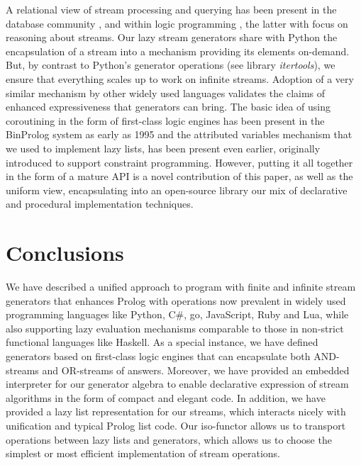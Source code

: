\documentclass{new_tlp}
\begin{document}
A relational view of stream processing and querying has been 
present in the database community 
\cite{Law11,Babcock02},
and 
within logic programming 
\cite{Beck15}, %
the latter with focus on
reasoning about streams.
Our lazy stream generators share with Python  \cite{pyref} the encapsulation of
a stream into a mechanism providing its elements on-demand. But, by contrast to
Python's generator operations (see library {\em itertools}), we ensure 
that everything scales up to work on infinite streams.
Adoption of a very similar mechanism by other widely
used languages validates the claims of 
enhanced expressiveness  that generators can bring.
The basic idea of using coroutining in the form of first-class logic engines
has been present in the BinProlog system  \cite{bp2011} as early as 1995 and
the attributed variables mechanism \cite{holz92} that we used to implement 
lazy lists, has been present even earlier, originally introduced to support constraint programming. However, putting it all together
in the form of a mature API is a 
 novel contribution of this paper,
 as well as the uniform view, encapsulating into an open-source library 
 our mix of declarative and procedural implementation techniques. 
 
\section{Conclusions}\label{conc}

We have described a unified approach to program with finite and infinite stream
generators that enhances Prolog with operations now prevalent in widely used
programming languages like Python, C\#, go, JavaScript, Ruby and Lua, while
also supporting lazy evaluation mechanisms comparable to those in non-strict
functional languages like Haskell. As a special instance, we have defined
generators based on first-class logic engines that can encapsulate both
AND-streams and OR-streams of answers.  Moreover, we have provided an embedded
interpreter for our generator algebra to enable declarative expression of
stream algorithms in the form of compact and elegant code.
% 
In addition, we have provided a lazy list representation for our streams, which
interacts nicely with unification and typical Prolog list code. Our iso-functor
allows us to transport operations between lazy lists and generators, which
allows us to choose the simplest or most efficient implementation of stream
operations.
\end{document}
